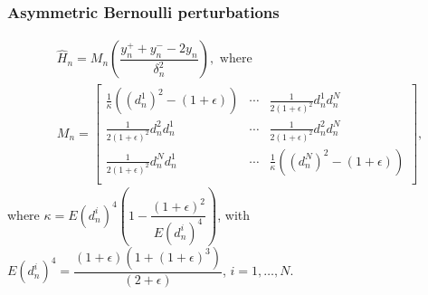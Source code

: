 \documentclass[letterpaper, 10 pt, conference]{ieeeconf}  %
\begin{document}
\subsubsection*{\textbf{Asymmetric Bernoulli perturbations}}

\begin{align}
\label{eq:2rdsa-estimate-ber}
&\widehat H_n = M_n \left(\dfrac{y_n^+ + y_n^- - 2 y_n}{\delta_n^2}\right), \text{ where }\\
& M_n =
\left[
\begin{array}{cccc}
\frac{1}{\kappa}\left((d_n^1)^2-(1+\epsilon)\right) & \cdots & \frac{1}{2(1+\epsilon)^2}d_n^1 d_n^N\\
\frac{1}{2(1+\epsilon)^2}d_n^2 d_n^1  &  \cdots & \frac{1}{2(1+\epsilon)^2}d_n^2 d_n^N\\
\frac{1}{2(1+\epsilon)^2}d_n^N d_n^1 & \cdots &  \frac{1}{\kappa}\left((d_n^N)^2-(1+\epsilon)\right) \\
\end{array}
\right],\nonumber
\end{align}
where $\kappa = E (d_n^i)^4 \left(1- \dfrac{(1+\epsilon)^2}{E (d_n^i)^4 }\right)$, with $E (d_n^i)^4= \dfrac{(1+\epsilon)(1+(1+\epsilon)^3)}{(2+\epsilon)}$, $i=1,\ldots,N$.
\end{document}
